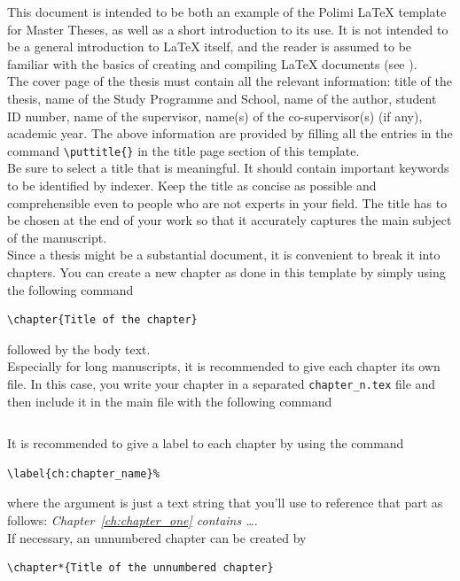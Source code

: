 \documentclass{config/PoliMi3i_thesis}
\begin{document}
This document is intended to be both an example of the Polimi \LaTeX{} template for Master Theses,
as well as a short introduction to its use. It is not intended to be a general introduction to \LaTeX{} itself,
and the reader is assumed to be familiar with the basics of creating and compiling \LaTeX{} documents (see \cite{oetiker1995not, kottwitz2015latex}).
\\
The cover page of the thesis must contain all the relevant information:
title of the thesis, name of the Study Programme and School, name of the author,
student ID number, name of the supervisor, name(s) of the co-supervisor(s) (if any), academic year.
The above information are provided by filling all the entries in the command \verb|\puttitle{}|
in the title page section of this template.
\\
Be sure to select a title that is meaningful.
It should contain important keywords to be identified by indexer.
Keep the title as concise as possible and comprehensible even to people who are not experts in your field.
The title has to be chosen at the end of your work so that it accurately captures the main subject of the manuscript.
\\
Since a thesis might be a substantial document, it is convenient to break it into chapters.
You can create a new chapter as done in this template by simply using the following command
\begin{verbatim}
\chapter{Title of the chapter}
\end{verbatim}
followed by the body text.
\\
Especially for long manuscripts, it is recommended to give each chapter its own file.
In this case, you write your chapter in a separated \verb|chapter_n.tex| file
and then include it in the main file with the following command
\begin{verbatim}

\end{verbatim}
It is recommended to give a label to each chapter by using the command
\begin{verbatim}
\label{ch:chapter_name}%
\end{verbatim}
where the argument is just a text string that you'll use to reference that part
as follows: \textit{Chapter~\ref{ch:chapter_one} contains   \dots}.\\
If necessary, an unnumbered chapter can be created by
\begin{verbatim}
\chapter*{Title of the unnumbered chapter}
\end{verbatim}
\end{document}
